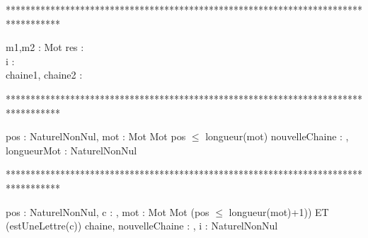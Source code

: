 ***********************************************************************************
\begin{algorithme}
     {m1,m2 : Mot}%
     {\booleen}%
     {res : \booleen \\ i : \entier \\ chaine1, chaine2 : \chaine}%
     {
                  {
                  }%
                  {
                    {
                       {
                       }
                       
                       
                    }
                   }%
      
      }
\end{algorithme}

***********************************************************************************
\begin{algorithme}
       {pos : NaturelNonNul, mot : Mot}
       {Mot}
       {pos $\leq$ longueur(mot)}
       {nouvelleChaine : \chaine, longueurMot : NaturelNonNul}
       {
             {
             }
        }
       
\end{algorithme}

***********************************************************************************
\begin{algorithme}
       {pos : NaturelNonNul, c : \caractere, mot : Mot}%
       {Mot}%
       {(pos $\leq$ longueur(mot)+1)) ET (estUneLettre(c))}%
       {chaine, nouvelleChaine : \chaine, i : NaturelNonNul}
       {
            {
            }

            
       }
\end{algorithme}

